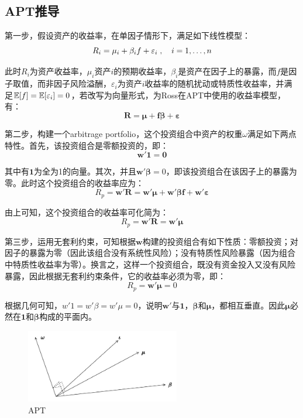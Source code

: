 \documentclass[11pt]{article}
\begin{document}
\begin{appendices}

\section{APT推导}

第一步，假设资产的收益率，在单因子情形下，满足如下线性模型：
\begin{equation*}
    R_i = \mu_i + \beta_i f + \varepsilon_i \;,\quad i =1,\dots,n
\end{equation*}

此时$R_i$为资产收益率，$\mu_i$资产$i$的预期收益率，$\beta_i$是资产在因子上的暴露，而$f$是因子取值，而非因子风险溢酬，$\varepsilon_i$为资产$i$收益率的随机扰动或特质性收益率，并满足$\mathbb{E}[f]=\mathbb{E}[\varepsilon_i]=0$，若改写为向量形式，为Ross在APT中使用的收益率模型，有：
\begin{equation*}
    \bm{R} = \bm{\mu + f\beta + \varepsilon}
\end{equation*}

第二步，构建一个arbitrage portfolio，这个投资组合中资产的权重$\omega$满足如下两点特性。首先，该投资组合是零额投资的，即：
\begin{equation*}
    \bm{w' 1 = 0}
\end{equation*}

其中有$\bm{1}$为全为1的向量。其次，并且$\bm{w'\beta}=0$，即该投资组合在该因子上的暴露为零。此时这个投资组合的收益率应为：
\begin{equation*}
    R_p = \bm{w'R = w'\mu + w'\beta f + w'\varepsilon}
\end{equation*}

由上可知，这个投资组合的收益率可化简为：
\begin{equation*}
    R_p = \bm{w'R = w'\mu} 
\end{equation*}

第三步，运用无套利约束，可知根据$\bm{w}$构建的投资组合有如下性质：零额投资；对因子的暴露为零（因此该组合没有系统性风险）；没有特质性风险暴露（因为组合中特质性收益率为零）。换言之，这样一个投资组合，既没有资金投入又没有风险暴露，因此根据无套利约束条件，它的收益率必须为零，即：
\begin{equation*}
    R_p = \bm{w'\mu} = 0
\end{equation*}

根据几何可知，$w' 1 = w' \beta = w'\mu = 0$，说明$\bm{w'}$与$\bm{1}$，$\bm{\beta}$和$\bm{\mu}$，都相互垂直。因此$\bm{\mu}$必然在$\bm{1}$和$\bm{\beta}$构成的平面内。

\begin{figure}[H]
    \centering
    \includegraphics[width=0.6\textwidth]{fig/apt.jpg}
    \caption{APT}
    \label{fig:apt}
\end{figure}


\end{appendices}
\end{document}

